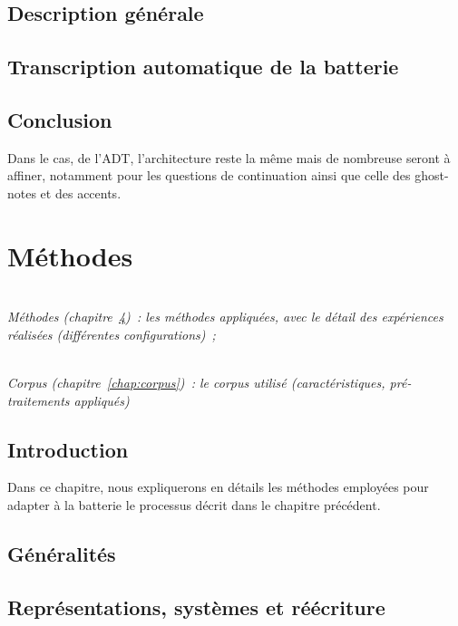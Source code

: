\documentclass[a4paper,11pt,twoside]{memoir}
\begin{document}
\section{Description générale}


\section{Transcription automatique de la batterie}



\section{Conclusion}
Dans le cas, de l’ADT, l’architecture reste la même mais de nombreuse seront à affiner, notamment pour les questions de continuation ainsi que celle des ghost-notes et des accents.



\chapter{Méthodes}
\label{chap:methodes}
\minitoc

\textit{\\Méthodes (chapitre~\ref{chap:methodes})~: les méthodes
appliquées, avec le détail des expériences réalisées (différentes
configurations)~;}

\textit{\\Corpus (chapitre~\ref{chap:corpus})~: le corpus utilisé
	\emph{(caractéristiques, pré-traitements appliqués)}}

\section{Introduction}
Dans ce chapitre, nous expliquerons en détails les méthodes employées pour adapter à la batterie le processus décrit dans le chapitre précédent.
\newpage

\section{Généralités}


\section{Représentations, systèmes et réécriture}
\end{document}
